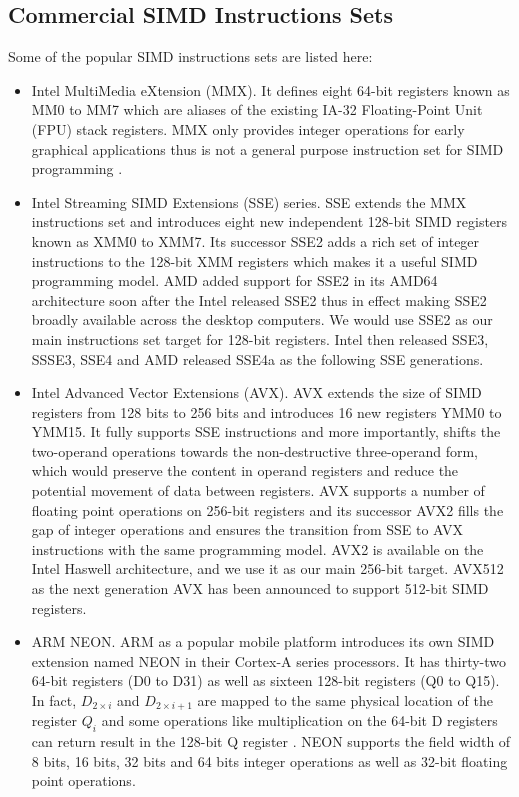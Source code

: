 \subsection{Commercial SIMD Instructions Sets}
Some of the popular SIMD instructions sets are listed here:
\begin{itemize}
  \item Intel MultiMedia eXtension (MMX). It defines eight 64-bit registers known as MM0 to MM7 which are aliases of the existing IA-32 Floating-Point Unit (FPU) stack registers. MMX only provides integer operations for early graphical applications thus is not a general purpose instruction set for SIMD programming \cite{hua_idisa}.
  \item Intel Streaming SIMD Extensions (SSE) series. SSE extends the MMX instructions set and introduces eight new independent 128-bit SIMD registers known as XMM0 to XMM7. Its successor SSE2 adds a rich set of integer instructions to the 128-bit XMM registers which makes it a useful SIMD programming model. AMD added support for SSE2 in its AMD64 architecture soon after the Intel released SSE2 thus in effect making SSE2 broadly available across the desktop computers. We would use SSE2 as our main instructions set target for 128-bit registers. Intel then released SSE3, SSSE3, SSE4 and AMD released SSE4a as the following SSE generations.
  \item Intel Advanced Vector Extensions (AVX). AVX extends the size of SIMD registers from 128 bits to 256 bits and introduces 16 new registers YMM0 to YMM15. It fully supports SSE instructions and more importantly, shifts the two-operand operations towards the non-destructive three-operand form, which would preserve the content in operand registers and reduce the potential movement of data between registers. AVX supports a number of floating point operations on 256-bit registers and its successor AVX2 fills the gap of integer operations and ensures the transition from SSE to AVX instructions with the same programming model. AVX2 is available on the Intel Haswell architecture, and we use it as our main 256-bit target. AVX512 as the next generation AVX has been announced to support 512-bit SIMD registers.
  \item ARM NEON\@. ARM as a popular mobile platform introduces its own SIMD extension named NEON in their Cortex-A series processors. It has thirty-two 64-bit registers (D0 to D31) as well as sixteen 128-bit registers (Q0 to Q15). In fact, $D_{2 \times i}$ and $D_{2 \times i + 1}$ are mapped to the same physical location of the register $Q_i$ and some operations like multiplication on the 64-bit D registers can return result in the 128-bit Q register \cite{hua_idisa}. NEON supports the field width of 8 bits, 16 bits, 32 bits and 64 bits integer operations as well as 32-bit floating point operations.
\end{itemize}

